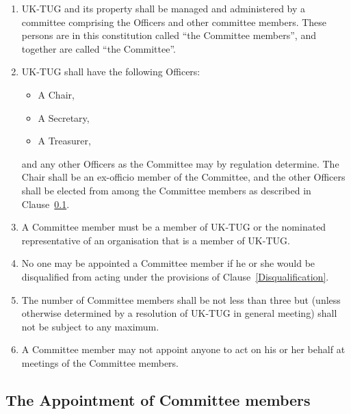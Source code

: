 \documentclass[a4paper,11pt]{article}
\begin{document}
\begin{enumerate}
\item UK-TUG and its property shall be managed and administered by a committee
  comprising the Officers and other committee members. These persons are in
  this constitution called ``the Committee members'', and together are called ``the
  Committee''.
\item UK-TUG shall have the following Officers:
\begin{itemize}
\item A Chair,
\item A Secretary,
\item A Treasurer,
\end{itemize}
  and any other Officers as the Committee may by regulation determine.
  The Chair shall be an ex-officio member of the Committee, and the other Officers
  shall be elected from among the Committee members as described in
  Clause~\ref{Appointment}.
\item A Committee member must be a member of UK-TUG or the nominated
  representative of an organisation that is a member of UK-TUG.
\item No one may be appointed a Committee member if he or she would be
  disqualified from acting under the provisions of Clause~\ref{Disqualification}.
\item The number of Committee members shall be not less than three but (unless
  otherwise determined by a resolution of UK-TUG in general meeting) shall not
  be subject to any maximum.
\item A Committee member may not appoint anyone to act on his or her behalf at
  meetings of the Committee members.
\end{enumerate}

\subsection{The Appointment of Committee members}
\label{Appointment}
\end{document}
